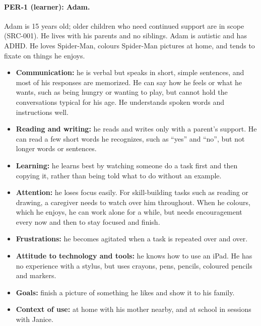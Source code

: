 \documentclass[12pt]{article}
\renewcommand{\_}{\textunderscore\allowbreak}%
\begin{document}
\paragraph{PER-1 (learner): Adam.}
Adam is 15 years old; older children who need continued support are in scope
(SRC-001). He lives with his parents and no siblings. Adam is autistic and has
ADHD. He loves Spider-Man, colours Spider-Man pictures at home, and tends to
fixate on things he enjoys.
\begin{itemize}
  \item \textbf{Communication:} he is verbal but speaks in short, simple
  sentences, and most of his responses are memorized. He can say how he feels or
  what he wants, such as being hungry or wanting to play, but cannot hold the
  conversations typical for his age. He understands spoken words and
  instructions well.
  \item \textbf{Reading and writing:} he reads and writes only with a parent's
  support. He can read a few short words he recognizes, such as ``yes'' and
  ``no'', but not longer words or sentences.
  \item \textbf{Learning:} he learns best by watching someone do a task first
  and then copying it, rather than being told what to do without an example.
  \item \textbf{Attention:} he loses focus easily. For skill-building tasks such
  as reading or drawing, a caregiver needs to watch over him throughout. When he
  colours, which he enjoys, he can work alone for a while, but needs
  encouragement every now and then to stay focused and finish.
  \item \textbf{Frustrations:} he becomes agitated when a task is repeated over
  and over.
  \item \textbf{Attitude to technology and tools:} he knows how to use an iPad.
  He has no experience with a stylus, but uses crayons, pens, pencils, coloured
  pencils and markers.
  \item \textbf{Goals:} finish a picture of something he likes and show it to
  his family.
  \item \textbf{Context of use:} at home with his mother nearby, and at school
  in sessions with Janice.
\end{itemize}
\end{document}

